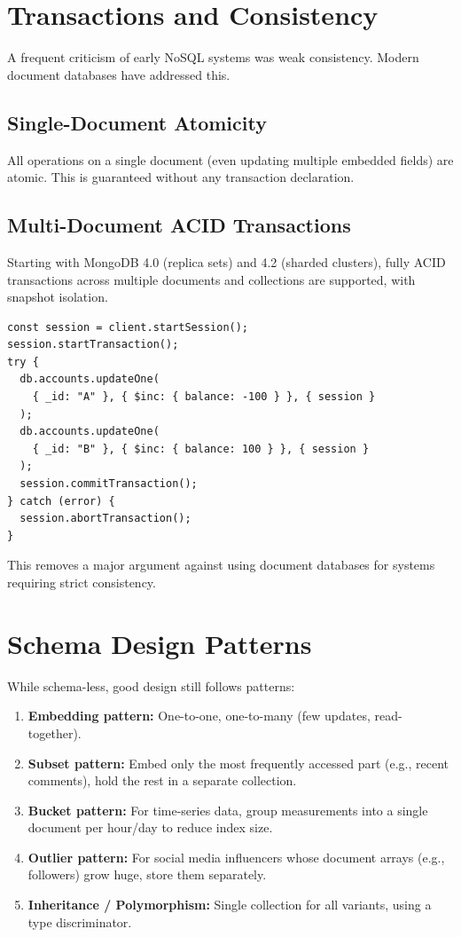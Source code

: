\documentclass[12pt,a4paper]{article}
\begin{document}
\section{Transactions and Consistency}
A frequent criticism of early NoSQL systems was weak consistency. Modern document databases have addressed this.

\subsection{Single-Document Atomicity}
All operations on a single document (even updating multiple embedded fields) are atomic. This is guaranteed without any transaction declaration.

\subsection{Multi-Document ACID Transactions}
Starting with MongoDB 4.0 (replica sets) and 4.2 (sharded clusters), fully ACID transactions across multiple documents and collections are supported, with snapshot isolation.
\begin{lstlisting}[caption=Multi-document transaction (Node.js pseudocode), label=lst:txn]
const session = client.startSession();
session.startTransaction();
try {
  db.accounts.updateOne(
    { _id: "A" }, { $inc: { balance: -100 } }, { session }
  );
  db.accounts.updateOne(
    { _id: "B" }, { $inc: { balance: 100 } }, { session }
  );
  session.commitTransaction();
} catch (error) {
  session.abortTransaction();
}
\end{lstlisting}
This removes a major argument against using document databases for systems requiring strict consistency.

\section{Schema Design Patterns}
While schema-less, good design still follows patterns:
\begin{enumerate}
    \item \textbf{Embedding pattern:} One-to-one, one-to-many (few updates, read-together).
    \item \textbf{Subset pattern:} Embed only the most frequently accessed part (e.g., recent comments), hold the rest in a separate collection.
    \item \textbf{Bucket pattern:} For time-series data, group measurements into a single document per hour/day to reduce index size.
    \item \textbf{Outlier pattern:} For social media influencers whose document arrays (e.g., followers) grow huge, store them separately.
    \item \textbf{Inheritance / Polymorphism:} Single collection for all variants, using a type discriminator.
\end{enumerate}
\end{document}
